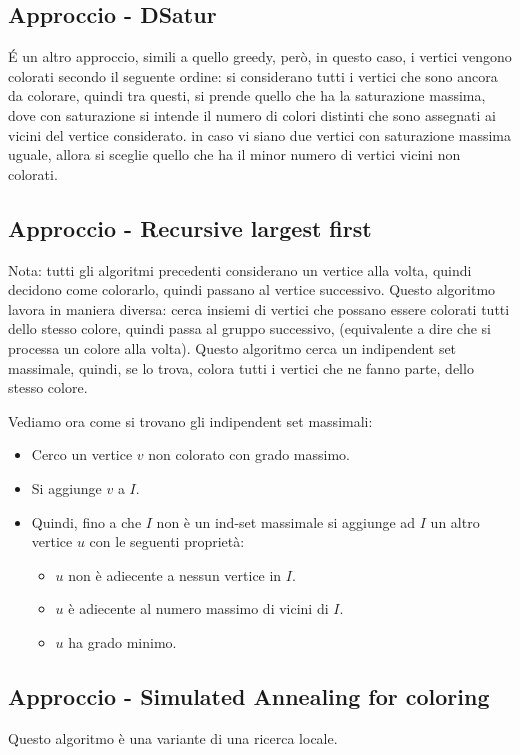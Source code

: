 \documentclass[12pt,a4paper]{article}
\begin{document}
\subsection{Approccio - DSatur}
É un altro approccio, simili a quello greedy, però, in questo caso, i vertici vengono colorati secondo il seguente ordine: si considerano tutti i vertici che sono ancora da colorare, quindi tra questi, si prende quello che ha la saturazione massima, dove con saturazione si intende il numero di colori distinti che sono assegnati ai vicini del vertice considerato. in caso vi siano due vertici con saturazione massima uguale, allora si sceglie quello che ha il minor numero di vertici vicini non colorati.

\subsection{Approccio - Recursive largest first}
Nota: tutti gli algoritmi precedenti considerano un vertice alla volta, quindi decidono come colorarlo, quindi passano al vertice successivo. Questo algoritmo lavora in maniera diversa: cerca insiemi di vertici che possano essere colorati tutti dello stesso colore, quindi passa al gruppo successivo, (equivalente a dire che si processa un colore alla volta).
Questo algoritmo cerca un indipendent set massimale, quindi, se lo trova, colora tutti i vertici che ne fanno parte, dello stesso colore.

Vediamo ora come si trovano gli indipendent set massimali:

\begin{itemize}
\item Cerco un vertice $v$ non colorato con grado massimo.
\item Si aggiunge $v$ a $I$.
\item Quindi, fino a che $I$ non è un ind-set massimale si aggiunge ad $I$ un altro vertice $u$ con le seguenti proprietà:
\begin{itemize}
\item $u$ non è adiecente a nessun vertice in $I$.
\item $u$ è adiecente al numero massimo di vicini di $I$.
\item $u$ ha grado minimo.
\end{itemize}
\end{itemize}

\subsection{Approccio - Simulated Annealing for coloring}
Questo algoritmo è una variante di una ricerca locale.
\end{document}
